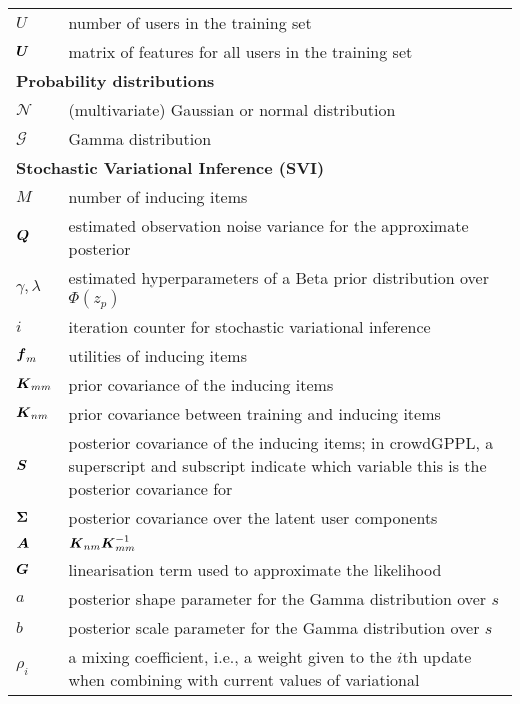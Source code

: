 \begin{table}
\begin{tabularx}{\columnwidth}{p{1.7cm} X }
 $U$ & number of users in the training set \\
 $\boldsymbol U$ & matrix of features for all users in the training set \\ 
 \multicolumn{2}{l}{\textbf{Probability distributions}} \\
 $\mathcal{N}$ & (multivariate) Gaussian or normal distribution \\
 $\mathcal{G}$ & Gamma distribution \\
 \multicolumn{2}{l}{\textbf{Stochastic Variational Inference (SVI) }} \\
 $M$ & number of inducing items \\
 $\boldsymbol Q$ & estimated observation noise variance for the approximate posterior \\
 $\gamma, \lambda$ & estimated hyperparameters of a Beta prior distribution over $\Phi(z_p)$ \\
 $i$ & iteration counter for stochastic variational inference \\
 $\boldsymbol f_m$ & utilities of inducing items \\
 $\boldsymbol K_{mm}$ & prior covariance of the inducing items \\
 $\boldsymbol K_{nm}$ & prior covariance between training and inducing items \\
 $\boldsymbol S$ & posterior covariance of the inducing items; in crowdGPPL, a superscript and subscript 
 indicate which variable this is the posterior covariance for \\
 $\boldsymbol\Sigma$ & posterior covariance over the latent user components \\
 $\boldsymbol A$ & $\boldsymbol K_{nm} \boldsymbol K_{mm}^{-1}$ \\
 $\boldsymbol G$ & linearisation term used to approximate the likelihood \\
 $a$ & posterior shape parameter for the Gamma distribution over $s$ \\
 $b$ & posterior scale parameter for the Gamma distribution over $s$ \\
 $\rho_i$ & a mixing coefficient, i.e., a weight given to the $i$th update when combining with current values of variational

\end{tabularx}
\end{table}
